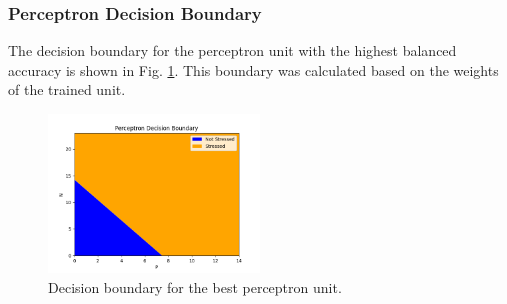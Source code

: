 \documentclass[a4paper, 11pt, titlepage]{article}
\newcommand{\figRef}[1]{Fig. \ref{#1}}
\begin{document}
  \subsubsection{Perceptron Decision Boundary}
  \par The decision boundary for the perceptron unit with the highest balanced
  accuracy is shown in \figRef{fig:perceptron_dec}.
  This boundary was calculated based on the weights of the trained unit.
  \begin{figure}[htb]
    \center
    \includegraphics[width=0.5\textwidth]{images/perceptron_dec_bound.png}
    \caption{Decision boundary for the best perceptron unit.}
    \label{fig:perceptron_dec}
  \end{figure}
\end{document}
